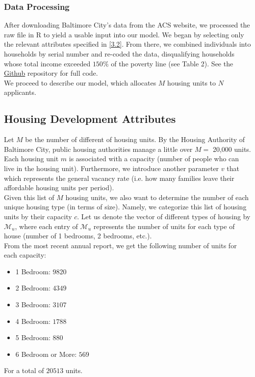 \documentclass[11pt]{article}
\begin{document}
\subsubsection{Data Processing}
After downloading Baltimore City's data from the ACS website, we processed the raw file in R to yield a usable input into our model. We began by selecting only the relevant attributes specified in \autoref{3.2}. From there, we combined individuals into households by serial number and re-coded the data, disqualifying households whose total income exceeded $150\%$ of the poverty line (see Table 2). See the \href{https://github.com/atulpokh/cpsc464final/tree/main}{Github} repository for full  code. \\
\newline
We proceed to describe our model, which allocates $M$ housing units to $N$ applicants. 
\subsection{Housing Development Attributes}
Let $M$ be the number of different of housing units. By the Housing Authority of Baltimore City, public housing authorities manage a little over $M = $ 20,000 units. Each housing unit $m$ is associated with a capacity (number of people who can live in the housing unit). Furthermore, we introduce another parameter $v$ that which represents the general vacancy rate (i.e. how many families leave their affordable housing units per period). \\
\newline
Given this list of $M$ housing units, we also want to determine the number of each unique housing type (in terms of size). Namely, we categorize this list of housing units by their capacity $c$. Let us denote the vector of different types of housing by $\mathcal{M}_u$, where each entry of $\mathcal{M}_u$ represents the number of units for each type of house (number of 1 bedrooms, 2 bedrooms, etc.). \\
\newline
From the most recent annual report, we get the following number of units for each capacity:
\begin{itemize}
    \item 1 Bedroom: $9820$
    \item 2 Bedroom: $4349$
    \item 3 Bedroom: $3107$
    \item 4 Bedroom: $1788$
    \item 5 Bedroom: $880$
    \item 6 Bedroom or More: $569$ 
\end{itemize}
For a total of $20513$ units.
\end{document}
